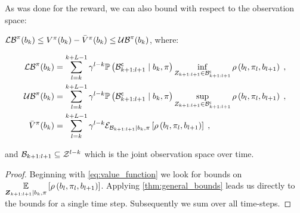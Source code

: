 As was done for the reward, we can also bound with respect to the observation space:
\begin{corollary}
	\label{thm:val_func_bounds_obs}
	$\lowerbound^\pi(\blf{k})\leq V^\pi(\blf{k})-\bar{V}^\pi(\blf{k})\leq\upperbound^\pi(\blf{k})$, where:
	\begin{small}
		\begin{subequations}
			\begin{align}
				\lowerbound\nolimits^\pi(\blf{k})& =\sum_{l=k}^{k+L-1}\gamma^{l-k}\measure{\stcompI{\subSpace}{k+1:l+1}\mid\blf{k},\pi}\inf_{\observations{k+1:l+1}\in\stcompI{\subSpace}{k+1:l+1}}\reward{\blf{l},\pi_l,\blf{l+1}}\;, \\
				\upperbound\nolimits^\pi(\blf{k})& =\sum_{l=k}^{k+L-1}\gamma^{l-k}\measure{\stcompI{\subSpace}{k+1:l+1}\mid\blf{k},\pi}\sup_{\observations{k+1:l+1}\in\stcompI{\subSpace}{k+1:l+1}}\reward{\blf{l},\pi_l,\blf{l+1}}\;, \\
				\bar{V}^\pi(\blf{k}) & =\sum_{l=k}^{k+L-1}\gamma^{l-k}\partialexpectation{\reward{\blf{l},\pi_l,\blf{l+1}}}{\subSpaceI{k+1:l+1}\mid\blf{k},\pi}\;,
			\end{align}
		\end{subequations}
	\end{small}
	and $\subSpaceI{k+1:l+1}\subseteq\observationSpace^{l-k}$ which is the joint observation space over time.
\end{corollary}
\begin{proof}
	Beginning with \eqref{eq:value_function} we look for bounds on $\expectation{\reward{\blf{l},\pi_l,\blf{l+1}}}{\observationsRV{k+1:l+1}\mid\blf{k},\pi}$. Applying \cref{thm:general_bounds} leads us directly to the bounds for a single time step. Subsequently we sum over all time-steps.
\end{proof}

